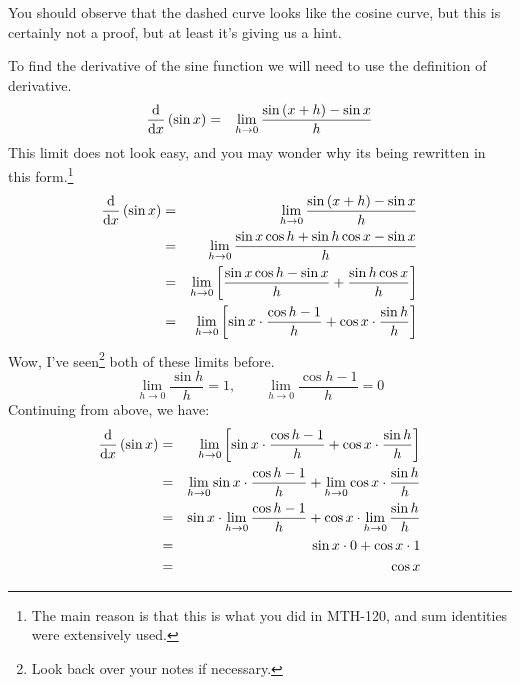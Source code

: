 \documentclass[12pt,addpoints, answers, fleqn]{exam}
\begin{document}
You should observe that the dashed curve looks like the cosine curve, but this is certainly not a proof, but at least it's giving us a hint.



To find the derivative of the sine function we will need to use the definition of derivative.
\begin{eqnarray*}
\frac{{\rm{d}}}{{\rm{d}}x} \left( \sin x \right) &=& \mathop {\lim }\limits_{ h \to 0} \frac{\sin \left( x + h \right) - \sin x}{h}
\end{eqnarray*}
This limit does not look easy, and you may wonder why its being rewritten in this form.\footnote{The main reason is that this is what you did in MTH-120, and sum identities were extensively used.}
\begin{eqnarray*}
\frac{{\rm{d}}}{{\rm{d}}x} \left( \sin x \right) &=& \mathop {\lim }\limits_{ h \to 0} \frac{\sin \left( x + h \right) - \sin x}{h}\\
&=& \mathop {\lim }\limits_{ h \to 0} \frac{\sin x \cos h + \sin h \cos x - \sin x}{h}\\
&=& \mathop {\lim }\limits_{ h \to 0} \left[\frac{\sin x \cos h - \sin x}{h} + \frac{\sin h \cos x}{h}\right]\\
&=& \mathop {\lim }\limits_{ h \to 0} \left[\sin x \cdot \frac{ \cos h - 1}{h} + \cos x \cdot \frac{\sin h }{h}\right]
\end{eqnarray*}
Wow, I've seen\footnote{Look back over your notes if necessary.} both of these limits before.
\[
\mathop {\lim }\limits_{ h \to 0} \frac{\sin h }{h} = 1, \qquad \mathop {\lim }\limits_{ h \to 0} \frac{ \cos h - 1}{h} = 0
\]
Continuing from above, we have:
\begin{eqnarray*}
\frac{{\rm{d}}}{{\rm{d}}x} \left( \sin x \right) &=& \mathop {\lim }\limits_{ h \to 0} \left[\sin x \cdot \frac{ \cos h - 1}{h} + \cos x \cdot \frac{\sin h }{h}\right]\\
&=& \mathop {\lim }\limits_{ h \to 0} \sin x \cdot \frac{ \cos h - 1}{h} +  \mathop {\lim }\limits_{ h \to 0}  \cos x \cdot \frac{\sin h }{h}\\
&=& \sin x \cdot \mathop {\lim }\limits_{ h \to 0}  \frac{ \cos h - 1}{h} +  \cos x \cdot \mathop {\lim }\limits_{ h \to 0}   \frac{\sin h }{h}\\
&=& \sin x \cdot 0 +  \cos x \cdot 1\\
&=& \cos x
\end{eqnarray*}



 
 
\end{document}
